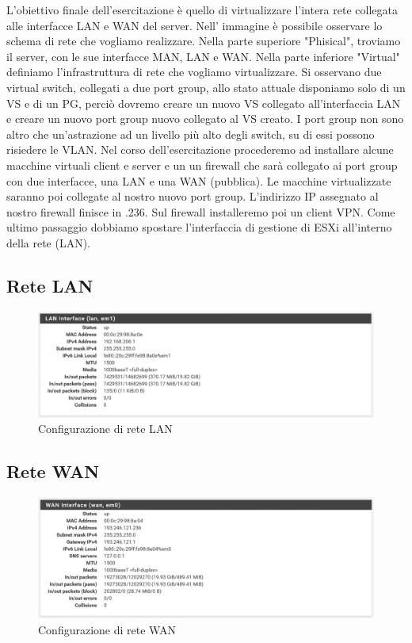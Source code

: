 \documentclass{article}
\begin{document}
\noindent 
L'obiettivo finale dell'esercitazione è quello di virtualizzare l'intera rete collegata alle interfacce LAN e WAN del server.
Nell' immagine è possibile osservare lo schema di rete che vogliamo realizzare.
Nella parte superiore "Phisical", troviamo il server, con le sue interfacce MAN, LAN e WAN.
Nella parte inferiore "Virtual" definiamo l'infrastruttura di rete che vogliamo virtualizzare. Si osservano due virtual switch, collegati a due
port group, allo stato attuale disponiamo solo di un VS e di un PG, perciò dovremo creare un nuovo VS
collegato all'interfaccia LAN e creare un nuovo port group nuovo collegato al VS creato.
I port group non sono altro che un'astrazione ad un livello più alto degli switch,
su di essi possono risiedere le VLAN.
Nel corso dell'esercitazione procederemo ad installare alcune macchine virtuali client e server e un un firewall che sarà collegato ai port group con due interfacce, una LAN e una WAN (pubblica).
Le macchine virtualizzate saranno poi collegate al nostro nuovo port group. L'indirizzo IP assegnato al nostro firewall
finisce in .236. Sul firewall installeremo poi un client VPN.
Come ultimo passaggio dobbiamo spostare l’interfaccia di gestione di ESXi all’interno della rete (LAN).

\subsection{Rete LAN}
\begin{figure}[H]
    \center
    \includegraphics[scale=0.52]{images/lan.png}
    \caption{Configurazione di rete LAN}\label{fig:1}
\end{figure}
\vspace{0.7 cm}
\subsection{Rete WAN}
\begin{figure}[H]
    \center
    \includegraphics[scale=0.52]{images/wan.png}
    \caption{Configurazione di rete WAN}\label{fig:1}
\end{figure}
\end{document}
